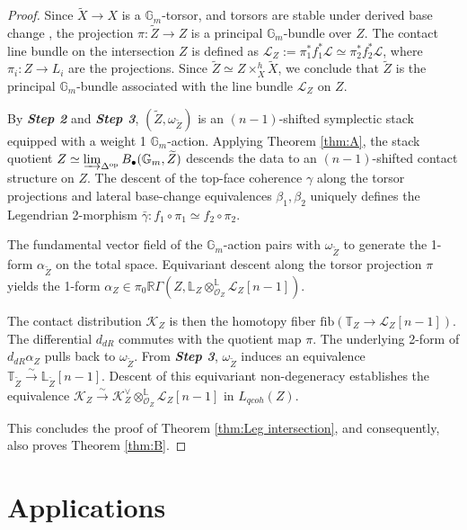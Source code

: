 \documentclass[reqno]{amsart}
\theoremstyle{definition}
\theoremstyle{remark}
\newcommand{\LL}{\mathbb{L}}
\newcommand{\TT}{\mathbb{T}}
\newcommand{\Gm}{\mathbb{G}_m}
\newcommand{\cO}{\mathcal{O}}
\newcommand{\cL}{\mathcal{L}}
\newcommand{\cK}{\mathcal{K}}
\begin{document}
{\begin{proof}
  Since $\widetilde{X} \to X$ is a $\Gm$-torsor, and torsors are stable under derived base change \cite[Section 1.3.5]{HAG-II}, the projection $\pi \colon \widetilde{Z} \to Z$ is a principal $\Gm$-bundle over $Z$. The contact line bundle on the intersection $Z$ is defined as $\cL_Z := \pi_1^* f_1^* \cL \simeq \pi_2^* f_2^* \cL$, where $\pi_i \colon Z \to L_i$ are the projections. Since $\widetilde{Z} \simeq Z \times_X^h \widetilde{X}$, we conclude that $\widetilde{Z}$ is the principal $\Gm$-bundle associated with the line bundle $\cL_Z$ on $Z$.

  By \textbf{\textit{Step 2}} and \textbf{\textit{Step 3}}, $(\widetilde{Z}, \omega_{\widetilde{Z}})$ is an $(n-1)$-shifted symplectic stack equipped with a weight 1 $\Gm$-action. Applying Theorem \ref{thm:A}, the stack quotient $Z \simeq \varinjlim_{\Delta^{\mathrm{op}}} B_\bullet(\Gm, \widetilde{Z})$ descends the data to an $(n-1)$-shifted contact structure on $Z$. The descent of the top-face coherence $\gamma$ along the torsor projections and lateral base-change equivalences $\beta_1, \beta_2$ uniquely defines the Legendrian 2-morphism $\bar{\gamma} \colon f_1 \circ \pi_1 \simeq f_2 \circ \pi_2$. 
  
  The fundamental vector field of the $\Gm$-action pairs with $\omega_{\widetilde{Z}}$ to generate the 1-form $\alpha_{\widetilde{Z}}$ on the total space. Equivariant descent along the torsor projection $\pi$ yields the 1-form $\alpha_Z \in \pi_0\mathbb{R}\Gamma(Z, \LL_Z \otimes^{\mathbb{L}}_{\cO_Z} \cL_Z[n-1])$. 
  
  The contact distribution $\cK_Z$ is then the homotopy fiber $\mathrm{fib}(\TT_Z \to \cL_Z[n-1])$. The differential $d_{dR}$ commutes with the quotient map $\pi$. The underlying 2-form of $d_{dR}\alpha_Z$ pulls back to $\omega_{\widetilde{Z}}$. From \textbf{\textit{Step 3}}, $\omega_{\widetilde{Z}}$ induces an equivalence $\TT_{\widetilde{Z}} \xrightarrow{\sim} \LL_{\widetilde{Z}}[n-1]$. Descent of this equivariant non-degeneracy establishes the equivalence $\cK_Z \xrightarrow{\sim} \cK_Z^\vee \otimes^{\mathbb{L}}_{\cO_Z} \cL_Z[n-1]$ in $L_{qcoh}(Z)$.

  This concludes the proof of Theorem \ref{thm:Leg intersection}, and consequently, also proves Theorem \ref{thm:B}.
\end{proof}

\section{Applications} \label{sec:moduli}
}
\end{document}
